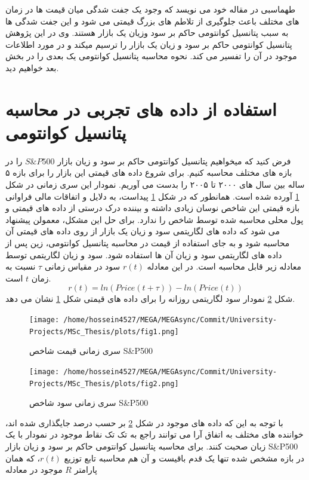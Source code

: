 \documentclass[a4paper,titlepage,12pt,fleqn,oneside]{report}
\begin{document}
	طهماسبی در مقاله خود می نویسد که وجود یک جفت شدگی میان قیمت ها در زمان های مختلف باعث جلوگیری از تلاطم های بزرگ قیمتی می شود و این جفت شدگی ها به سبب پتانسیل کوانتومی حاکم بر سود وزیان یک بازار هستند. وی در این پژوهش پتانسیل کوانتومی حاکم بر سود و زیان یک بازار را ترسیم میکند و در مورد اطلاعات موجود در آن را تفسیر می کند. نحوه محاسبه پتانسیل کوانتومی یک بعدی را در بخش بعد خواهیم دید.
	
	\section{استفاده از داده های تجربی در محاسبه پتانسیل کوانتومی}
	فرض کنید که میخواهیم پتانسیل کوانتومی  حاکم بر سود و زیان بازار 
	$S\&P500$
	را در بازه های مختلف محاسبه کنیم.
	برای شروع داده های قیمتی  این بازار را برای بازه ۵ ساله بین سال های ۲۰۰۰ تا ۲۰۰۵ را بدست می آوریم. نمودار این سری زمانی در شکل
	\ref{fig:1}
	آورده شده است.
	همانطور که در شکل 
	\ref{fig:1}
	پیداست، به دلایل و اتفاقات مالی فراوانی بازه قیمتی این شاخص نوسان زیادی داشته و بیننده درک درستی از داده های قیمتی و پول محلی محاسبه شده توسط شاخص را ندارد. برای حل این مشکل، معمولن پیشنهاد می شود که داده های لگاریتمی سود و زیان یک بازار از روی داده های قیمتی آن محاسبه شود و به جای استفاده از قیمت در محاسبه پتانسیل کوانتومی، زین پس از داده های لگاریتمی سود و زیان آن ها استفاده شود. سود و زیان لگاریتمی توسط معادله زیر قابل محاسبه است. در این معادله $r(t)$  سود در مقیاس زمانی $\tau$ نسبت به زمان $t$ است.
	\begin{equation}
		r(t) = ln\left(Price(t+\tau)\right)-ln\left(Price\left(t\right)\right)
		\label{eq:3.2}
	\end{equation}
	شکل 
	\ref{fig:2}
	نمودار سود لگاریتمی روزانه را برای داده های قیمتی شکل 
	\ref{fig:1}
	نشان می دهد.
	\begin{figure}[ptb]
		\centering
		\texttt{[image: /home/hossein4527/MEGA/MEGAsync/Commit/University-Projects/MSc\_Thesis/plots/fig1.png]}
		\caption{سری زمانی قیمت شاخص S\&P500}
		\label{fig:1}
	\end{figure}
	\begin{figure}[ptb]
		\centering
		\texttt{[image: /home/hossein4527/MEGA/MEGAsync/Commit/University-Projects/MSc\_Thesis/plots/fig2.png]}
		\caption{سری زمانی سود شاخص S\&P500}
		\label{fig:2}
	\end{figure}
	با توجه به این که داده های موجود در شکل 
	\ref{fig:2}
	بر حسب درصد جایگذاری شده اند، خواننده های مختلف به اتفاق آرا می توانند راجع به تک تک نقاط موجود در نمودار با یک زبان صحبت کنند.
	برای محاسبه پتانسیل کوانتومی حاکم بر سود و زیان بازار 
	S\&P500
	در بازه مشخص شده تنها یک قدم باقیست و آن هم محاسبه تابع توزیع $r(t)$، که همان پارامتر $R$ موجود در معادله 
\end{document}
